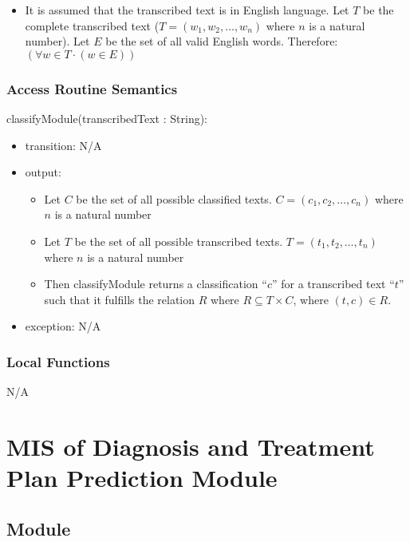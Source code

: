 \documentclass[12pt, titlepage]{article}
\begin{document}
\begin{itemize}
  \item It is assumed that the transcribed text is in English language. Let $T$ be the complete transcribed text ($T = (w_1, w_2, \ldots, w_n)$ where $n$ is a natural number). Let $E$ be the set of all valid English words. Therefore: $(\forall w \in T \cdot (w \in E))$
\end{itemize}

\subsubsection{Access Routine Semantics}

\noindent classifyModule(transcribedText : String):

\begin{itemize}
\item transition: N/A
\item output: 
  \begin{itemize}
    \item Let $C$ be the set of all possible classified texts. $C = (c_1, c_2, \ldots, c_n)$ where $n$ is a natural number
    \item Let $T$ be the set of all possible transcribed texts. $T = (t_1, t_2, \ldots, t_n)$ where $n$ is a natural number
    \item Then classifyModule returns a classification ``$c$'' for a transcribed text ``$t$'' such that it fulfills the relation $R$ where $R \subseteq T \times C$, where $(t, c) \in R$.
  \end{itemize}
\item exception: N/A 
\end{itemize}



\subsubsection{Local Functions}

N/A

\newpage

\section{MIS of Diagnosis and Treatment Plan Prediction Module} \label{diag_pred_mod}

\subsection{Module}
\end{document}

